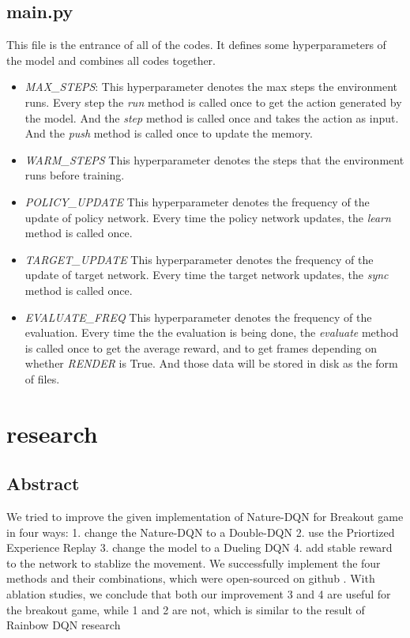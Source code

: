 \documentclass[a4paper, 11pt]{article}
\begin{document}
\subsection{main.py}
This file is the entrance of all of the codes.
It defines some hyperparameters of the model
and combines all codes together.
\begin{itemize}\setlength{\itemsep}{-\itemsep}
      \item \emph{MAX\_STEPS}:
            This hyperparameter denotes the max steps
            the environment runs.
            Every step the \emph{run} method is called once
            to get the action generated by the model.
            And the \emph{step} method is called once
            and takes the action as input.
            And the \emph{push} method is called once
            to update the memory.
      \item \emph{WARM\_STEPS}
            This hyperparameter denotes the steps
            that the environment runs before training.
      \item \emph{POLICY\_UPDATE}
            This hyperparameter denotes the frequency
            of the update of policy network.
            Every time the policy network updates,
            the \emph{learn} method is called once.
      \item \emph{TARGET\_UPDATE}
            This hyperparameter denotes the frequency
            of the update of target network.
            Every time the target network updates,
            the \emph{sync} method is called once.
      \item \emph{EVALUATE\_FREQ}
            This hyperparameter denotes the frequency
            of the evaluation.
            Every time the the evaluation is being done,
            the \emph{evaluate} method is called once
            to get the average reward, and to get frames depending on
            whether \emph{RENDER} is True.
            And those data will be stored in disk as the form of files.
\end{itemize}

\section{research}
\subsection{Abstract}
We tried to improve the given implementation \cite{ref1} of Nature-DQN for Breakout game in four ways: 1. change the Nature-DQN to a Double-DQN 2. use the Priortized Experience Replay 3. change the model to a Dueling DQN 4. add stable reward to the network to stablize the movement. We successfully implement the four methods and their combinations, which were open-sourced on github \cite{ref2}. With ablation studies, we conclude that both our improvement 3 and 4 are useful for the breakout game, while 1 and 2 are not, which is similar to the result of Rainbow DQN research \cite{ref7}
\end{document}
